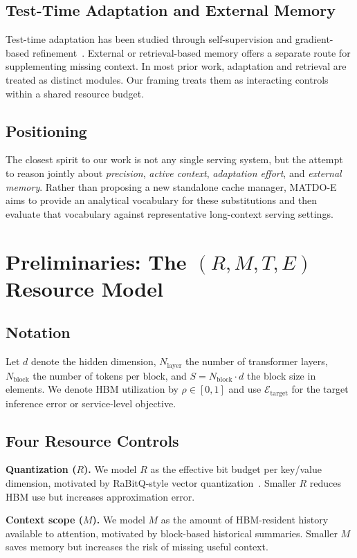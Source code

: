 \documentclass[11pt,a4paper]{article}
\theoremstyle{plain}
\theoremstyle{definition}
\begin{document}
\subsection{Test-Time Adaptation and External Memory}
Test-time adaptation has been studied through self-supervision and gradient-based refinement~\cite{sun2020,kuratov2026gradmem}. External or retrieval-based memory offers a separate route for supplementing missing context. In most prior work, adaptation and retrieval are treated as distinct modules. Our framing treats them as interacting controls within a shared resource budget.

\subsection{Positioning}
The closest spirit to our work is not any single serving system, but the attempt to reason jointly about \emph{precision}, \emph{active context}, \emph{adaptation effort}, and \emph{external memory}. Rather than proposing a new standalone cache manager, MATDO-E aims to provide an analytical vocabulary for these substitutions and then evaluate that vocabulary against representative long-context serving settings.

\section{Preliminaries: The $(R,M,T,E)$ Resource Model}
\label{sec:model}

\subsection{Notation}
Let $d$ denote the hidden dimension, $N_{\text{layer}}$ the number of transformer layers, $N_{\text{block}}$ the number of tokens per block, and $S = N_{\text{block}} \cdot d$ the block size in elements. We denote HBM utilization by $\rho \in [0,1]$ and use $\mathcal{E}_{\text{target}}$ for the target inference error or service-level objective.

\subsection{Four Resource Controls}
\textbf{Quantization ($R$).} We model $R$ as the effective bit budget per key/value dimension, motivated by RaBitQ-style vector quantization~\cite{gao2024rabitq}. Smaller $R$ reduces HBM use but increases approximation error.

\textbf{Context scope ($M$).} We model $M$ as the amount of HBM-resident history available to attention, motivated by block-based historical summaries. Smaller $M$ saves memory but increases the risk of missing useful context.
\end{document}
